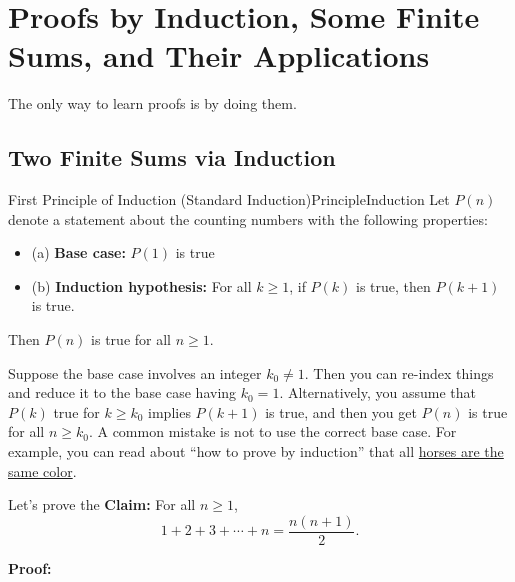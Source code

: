 \section{Proofs by Induction, Some Finite Sums, and Their Applications}

The only way to learn proofs is by doing them. 


\subsection{Two Finite Sums via Induction}

\begin{logicColor}{First Principle of Induction (Standard Induction)}{PrincipleInduction}
      Let $P(n)$ denote a statement about the counting numbers with the following properties:
        \begin{itemize}
            \item[] (a) \textbf{Base case:} $P(1)$ is true
            \item[] (b) \textbf{Induction hypothesis:} For all $k\ge 1$, if $P(k)$ is true, then $P(k+1)$ is true.
        \end{itemize}
Then $P(n)$ is true for all $n \geq 1$.
    
\end{logicColor}

\begin{rem}
Suppose the base case involves an integer $k_0 \neq 1$. Then you can re-index things and reduce it to the base case having $k_0=1$. Alternatively, you assume that $P(k)$ true for $k \ge k_0$ implies  $P(k+1)$ is true, and then you get $P(n)$ is true for all $n \geq k_0$. A common mistake is not to use the correct base case. For example, you can read about ``how to prove by induction'' that all  \href{https://en.wikipedia.org/wiki/All_horses_are_the_same_color}{horses are the same color}. 
\end{rem} 

    \bigskip
\begin{example} 
\label{ex:SumFirstIntegersPower1}
Let's prove the \textbf{Claim:}  For all $n \geq 1$, 
\begin{equation}
\label{eqn:SumFirstIntegers}
    1+2 + 3 + \cdots + n = \frac{n(n+1)}{2}.
\end{equation}
\end{example}

\textbf{Proof:} 

